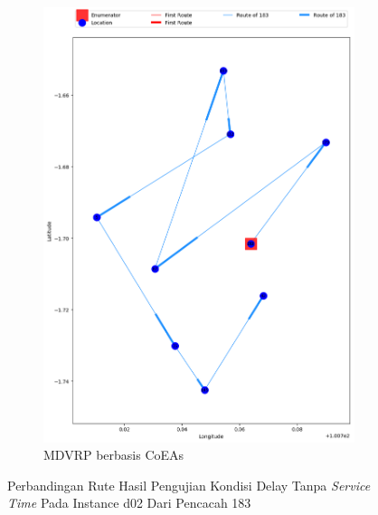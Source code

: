 \begin{figure}[H]
	\centering
	\begin{subfigure}[t]{\textwidth}
		\centering
		\includegraphics[width=\textwidth]{Resources/Images/delayed_2/real_m15_n100_delayed_2_183_coes}
		\caption{MDVRP berbasis CoEAs}
		\label{fig:real_m15_n100_delayed_2_183_coes}
	\end{subfigure}
	\caption{Perbandingan Rute Hasil Pengujian Kondisi Delay Tanpa \textit{Service Time} Pada Instance d02 Dari Pencacah 183}
	\label{fig:real_m15_n100_delayed_2_183}
\end{figure}


